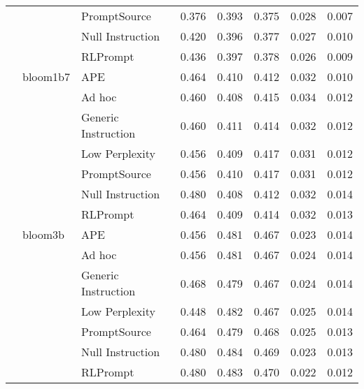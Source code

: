 \begin{supertabular}{lllrrrrr}
              &        & PromptSource &            0.376 &           0.393 &          0.375 &        0.028 &    0.007 \\
              &        & Null Instruction &            0.420 &           0.396 &          0.377 &        0.027 &    0.010 \\
              &        & RLPrompt &            0.436 &           0.397 &          0.378 &        0.026 &    0.009 \\
              & bloom1b7 & APE &            0.464 &           0.410 &          0.412 &        0.032 &    0.010 \\
              &        & Ad hoc &            0.460 &           0.408 &          0.415 &        0.034 &    0.012 \\
              &        & Generic Instruction &            0.460 &           0.411 &          0.414 &        0.032 &    0.012 \\
              &        & Low Perplexity &            0.456 &           0.409 &          0.417 &        0.031 &    0.012 \\
              &        & PromptSource &            0.456 &           0.410 &          0.417 &        0.031 &    0.012 \\
              &        & Null Instruction &            0.480 &           0.408 &          0.412 &        0.032 &    0.014 \\
              &        & RLPrompt &            0.464 &           0.409 &          0.414 &        0.032 &    0.013 \\
              & bloom3b & APE &            0.456 &           0.481 &          0.467 &        0.023 &    0.014 \\
              &        & Ad hoc &            0.456 &           0.481 &          0.467 &        0.024 &    0.014 \\
              &        & Generic Instruction &            0.468 &           0.479 &          0.467 &        0.024 &    0.014 \\
              &        & Low Perplexity &            0.448 &           0.482 &          0.467 &        0.025 &    0.014 \\
              &        & PromptSource &            0.464 &           0.479 &          0.468 &        0.025 &    0.013 \\
              &        & Null Instruction &            0.480 &           0.484 &          0.469 &        0.023 &    0.013 \\
              &        & RLPrompt &            0.480 &           0.483 &          0.470 &        0.022 &    0.012 \\

\end{supertabular}
